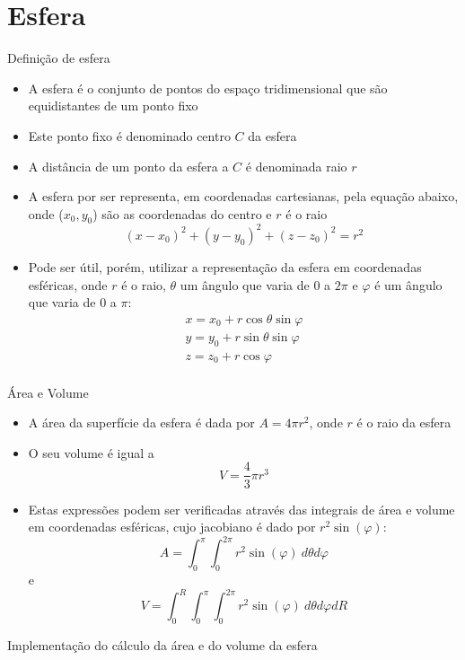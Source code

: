 \section{Esfera}

\begin{frame}[fragile]{Definição de esfera}

    \begin{itemize}
        \item A esfera é o conjunto de pontos do espaço tridimensional que são equidistantes
            de um ponto fixo

        \item Este ponto fixo é denominado centro $C$ da esfera

        \item A distância de um ponto da esfera a $C$ é denominada raio $r$

        \item A esfera por ser representa, em coordenadas cartesianas, pela equação abaixo,
onde ($x_0, y_0$) são as coordenadas do centro e $r$ é o raio
        \[
            (x - x_0)^2 + (y - y_0)^2 + (z - z_0)^2 = r^2
        \]

        \item Pode ser útil, porém, utilizar a representação da esfera em coordenadas esféricas, 
            onde $r$ é o raio, $\theta$ um ângulo que varia de 0 a $2\pi$ e $\varphi$ é um ângulo 
            que varia de 0 a $\pi$:
        \[
            \begin{array}{l}
                x = x_0 + r\cos \theta\sin \varphi \\
                y = y_0 + r\sin \theta\sin \varphi \\
                z = z_0 + r\cos \varphi \\
            \end{array}
        \]

    \end{itemize}

\end{frame}

\begin{frame}[fragile]{Área e Volume}

    \begin{itemize}
        \item A área da superfície da esfera é dada por $A = 4\pi r^2$, onde $r$ é o raio
            da esfera

        \item O seu volume é igual a 
        \[
            V = \frac{4}{3}\pi r^3
        \]

        \item Estas expressões podem ser verificadas através das integrais de área e volume 
            em coordenadas esféricas, cujo jacobiano é dado por $r^2\sin(\varphi)$:
        \[
            A = \int_0^\pi \int_0^{2\pi} r^2\sin(\varphi)\ d\theta d\varphi
        \]
        e
        \[
            V = \int_0^R \int_0^\pi \int_0^{2\pi} r^2\sin(\varphi)\ d\theta d\varphi dR
        \]

    \end{itemize}

\end{frame}

\begin{frame}[fragile]{Implementação do cálculo da área e do volume da esfera}
\end{frame}
